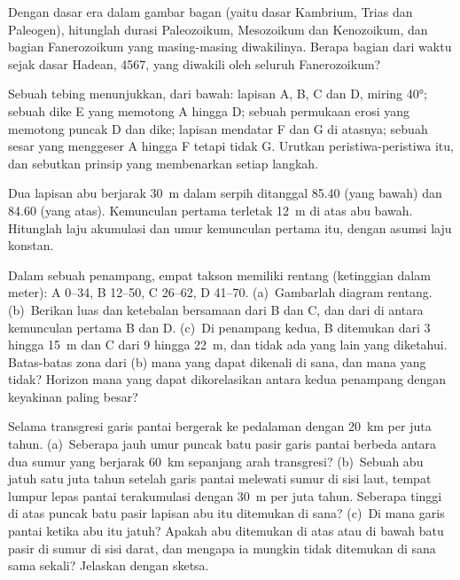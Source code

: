 \begin{exercise}[$\star$]\label{exo:b1:stratigraphic-scale:2}
Dengan dasar era dalam gambar bagan (yaitu dasar Kambrium, Trias dan Paleogen), hitunglah durasi Paleozoikum, Mesozoikum dan Kenozoikum, dan bagian Fanerozoikum
yang masing-masing diwakilinya. Berapa bagian dari waktu sejak dasar Hadean, \qty{4567}{\Ma}, yang diwakili oleh seluruh Fanerozoikum?
\end{exercise}

\begin{exercise}[$\star$]\label{exo:b1:stratigraphic-scale:3}
Sebuah tebing menunjukkan, dari bawah: lapisan A, B, C dan D, miring \ang{40}; sebuah dike E yang memotong A hingga D; sebuah permukaan erosi yang memotong puncak D dan dike; lapisan mendatar F dan G di atasnya; sebuah sesar yang menggeser A hingga F tetapi tidak G. Urutkan peristiwa-peristiwa itu, dan sebutkan prinsip yang membenarkan setiap langkah.
\end{exercise}

\begin{exercise}[$\star$]\label{exo:b1:stratigraphic-scale:4}
Dua lapisan abu berjarak \qty{30}{m} dalam serpih ditanggal \qty{85.40}{\Ma} (yang bawah) dan \qty{84.60}{\Ma} (yang atas). Kemunculan pertama  terletak \qty{12}{m} di atas abu bawah. Hitunglah laju akumulasi dan umur kemunculan pertama itu, dengan asumsi laju konstan.
\end{exercise}

\begin{exercise}[$\star\star$]\label{exo:b1:stratigraphic-scale:5}
Dalam sebuah penampang, empat takson memiliki rentang (ketinggian dalam meter): A 0--34, B 12--50, C 26--62, D 41--70. (a)~Gambarlah diagram rentang. (b)~Berikan luas dan ketebalan  bersamaan dari B dan C, dan dari  di antara kemunculan pertama B dan D. (c)~Di penampang kedua, B ditemukan dari 3 hingga 15~m dan C dari 9 hingga 22~m, dan tidak ada yang lain yang diketahui. Batas-batas zona dari (b) mana yang dapat dikenali di sana, dan mana yang tidak? Horizon mana yang dapat dikorelasikan antara kedua penampang dengan keyakinan paling besar?
\end{exercise}

\begin{exercise}[$\star\star$]\label{exo:b1:stratigraphic-scale:6}
Selama transgresi garis pantai bergerak ke pedalaman dengan \qty{20}{km} per juta tahun. (a)~Seberapa jauh umur puncak batu pasir garis pantai berbeda antara dua sumur yang berjarak \qty{60}{km} sepanjang arah transgresi? (b)~Sebuah abu jatuh satu juta tahun setelah garis pantai melewati sumur di sisi laut, tempat lumpur lepas pantai terakumulasi dengan \qty{30}{m} per juta tahun. Seberapa tinggi di atas puncak batu pasir lapisan abu itu ditemukan di sana? (c)~Di mana garis pantai ketika abu itu jatuh? Apakah abu ditemukan di atas atau di bawah batu pasir di sumur di sisi darat, dan mengapa ia mungkin tidak ditemukan di sana sama sekali? Jelaskan dengan sketsa.
\end{exercise}

